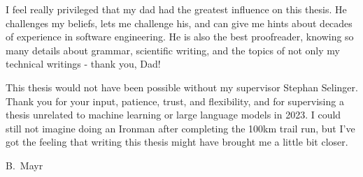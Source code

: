 I feel really privileged that my dad had the greatest influence on this thesis.
He challenges my beliefs, lets me challenge his, and can give me hints about decades of experience in software engineering.
He is also the best proofreader, knowing so many details about grammar, scientific writing, and the topics of not only my technical writings - thank you, Dad!

This thesis would not have been possible without my supervisor Stephan Selinger.
Thank you for your input, patience, trust, and flexibility, and for supervising a thesis unrelated to machine learning or large language models in 2023.
I could still not imagine doing an Ironman after completing the 100km trail run, but I've got the feeling that writing this thesis might have brought me a little bit closer.

\vspace{6ex}
\noindent
B.\ Mayr